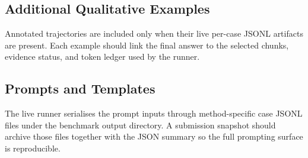 \subsection{Additional Qualitative Examples}

Annotated trajectories are included only when their live per-case JSONL
artifacts are present. Each example should link the final answer to
the selected chunks, evidence status, and token ledger used by the
runner.

\subsection{Prompts and Templates}

The live runner serialises the prompt inputs through method-specific
case JSONL files under the benchmark output directory. A submission
snapshot should archive those files together with the JSON summary so
the full prompting surface is reproducible.
